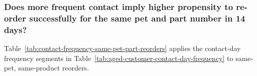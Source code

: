 \subsubsection{Does more frequent contact imply higher propensity to re-order successfully for the same pet and part number in 14 days?}
Table~\ref{tab:contact-frequency-same-pet-part-reorders} applies the contact-day
frequency segments in Table~\ref{tab:aged-customer-contact-day-frequency}
to same-pet, same-product reorders.





\clearpage

